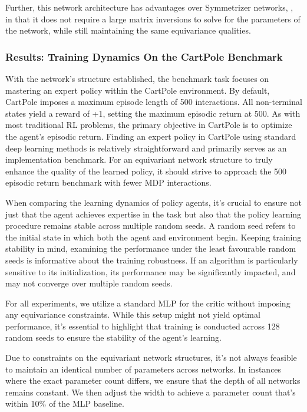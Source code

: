 Further, this network architecture has advantages over Symmetrizer networks, \cite{vanderpol2020mdp}, in that it does not require a large matrix inversions to solve for the parameters of the network, while still maintaining the same equivariance qualities.

\subsubsection{Results: Training Dynamics On the CartPole Benchmark}
With the network's structure established, the benchmark task focuses on mastering an expert policy within the CartPole environment. By default, CartPole imposes a maximum episode length of 500 interactions. All non-terminal states yield a reward of +1, setting the maximum episodic return at 500. As with most traditional RL problems, the primary objective in CartPole is to optimize the agent's episodic return. Finding an expert policy in CartPole using standard deep learning methods is relatively straightforward and primarily serves as an implementation benchmark. For an equivariant network structure to truly enhance the quality of the learned policy, it should strive to approach the 500 episodic return benchmark with fewer MDP interactions.

When comparing the learning dynamics of policy agents, it's crucial to ensure not just that the agent achieves expertise in the task but also that the policy learning procedure remains stable across multiple random seeds. A random seed refers to the initial state in which both the agent and environment begin. Keeping training stability in mind, examining the performance under the least favourable random seeds is informative about the training robustness. If an algorithm is particularly sensitive to its initialization, its performance may be significantly impacted, and may not converge over multiple random seeds.

For all experiments, we utilize a standard MLP for the critic without imposing any equivariance constraints. While this setup might not yield optimal performance, it's essential to highlight that training is conducted across 128 random seeds to ensure the stability of the agent's learning.

Due to constraints on the equivariant network structures, it's not always feasible to maintain an identical number of parameters across networks. In instances where the exact parameter count differs, we ensure that the depth of all networks remains constant. We then adjust the width to achieve a parameter count that's within 10\% of the MLP baseline.

